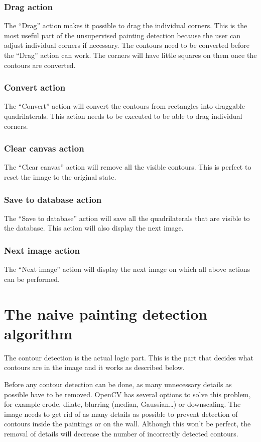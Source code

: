 \subsubsection{Drag action}
The ``Drag'' action makes it possible to drag the individual corners. This is the most useful part of the unsupervised painting detection because the user can adjust individual corners if necessary. The contours need to be converted before the ``Drag'' action can work. The corners will have little squares on them once the contours are converted.

\subsubsection{Convert action}
The ``Convert'' action will convert the contours from rectangles into draggable quadrilaterals. This action needs to be executed to be able to drag individual corners.

\subsubsection{Clear canvas action}
The ``Clear canvas'' action will remove all the visible contours. This is perfect to reset the image to the original state.

\subsubsection{Save to database action}
The ``Save to database'' action will save all the quadrilaterals that are visible to the database. This action will also display the next image.

\subsubsection{Next image action}
The ``Next image'' action will display the next image on which all above actions can be performed.

\section{The naive painting detection algorithm}
\label{sec:contour_detection}
The contour detection is the actual logic part. This is the part that decides what contours are in the image and it works as described below.

Before any contour detection can be done, as many unnecessary details as possible have to be removed. OpenCV has several options to solve this problem, for example erode, dilate, blurring (median, Gaussian\dots) or downscaling. The image needs to get rid of as many details as possible to prevent detection of contours inside the paintings or on the wall. Although this won't be perfect, the removal of details will decrease the number of incorrectly detected contours.

